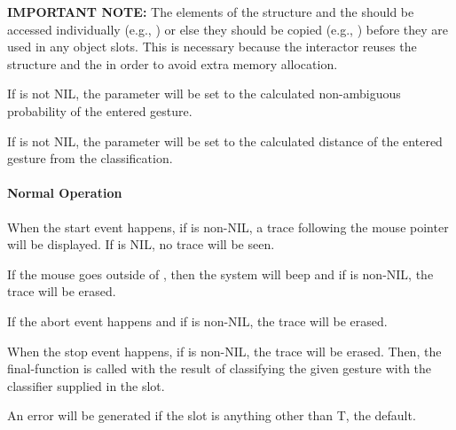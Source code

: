 {\bf IMPORTANT NOTE:} The elements of the  structure and the
 should be accessed individually
(e.g., )
or else they should be copied
(e.g., )
before they are used in any object slots.  This is necessary because
the interactor reuses the  structure and the 
in order to avoid extra memory allocation.

If  is not NIL, the  parameter will be
set to the calculated non-ambiguous probability of the entered gesture.

If  is not NIL, the  parameter will be
set to the calculated distance of the entered gesture from the
classification.

\paragraph{Normal Operation}
When the start event happens, if  is non-NIL, a trace
following the mouse pointer will be displayed.  If 
is NIL, no trace will be seen.

If the mouse goes outside of , then the system will
beep and if  is non-NIL, the trace will be erased.

If the abort event happens and if  is non-NIL, the trace
will be erased.

When the stop event happens, if  is non-NIL, the trace
will be erased. Then, the final-function is called with the result of
classifying the given gesture with the classifier supplied in the
 slot.

An error will be generated if the  slot is anything
other than T, the default.

